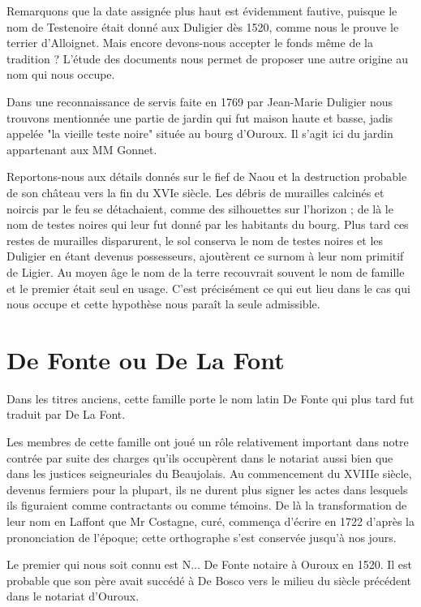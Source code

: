 Remarquons que la date assignée plus haut est évidemment fautive, puisque le nom de Testenoire était donné aux Duligier dès 1520, comme nous le prouve le terrier d'Alloignet. Mais encore devons-nous accepter le fonds même de la tradition ? L'étude des documents nous permet de proposer une autre origine au nom qui nous occupe.

Dans une reconnaissance de servis faite en 1769 par Jean-Marie Duligier nous trouvons mentionnée une partie de jardin qui fut maison haute et basse, jadis appelée "la vieille teste noire" située au bourg d'Ouroux. Il s'agit ici du jardin appartenant aux MM Gonnet.

Reportons-nous aux détails donnés sur le fief de Naou et la destruction probable de son château vers la fin du XVIe siècle. Les débris de murailles calcinés et noircis par le feu se détachaient, comme des silhouettes sur l'horizon ; de là le nom de testes noires qui leur fut donné par les habitants du bourg. Plus tard ces restes de murailles disparurent, le sol conserva le nom de testes noires et les Duligier en étant devenus possesseurs, ajoutèrent ce surnom à leur nom primitif de Ligier. Au moyen âge le nom de la terre recouvrait souvent le nom de famille et le premier était seul en usage. C'est précisément ce qui eut lieu dans le cas qui nous occupe et cette hypothèse nous paraît la seule admissible.

\section*{De Fonte ou De La Font}

Dans les titres anciens, cette famille porte le nom latin De Fonte qui plus tard fut traduit par De La Font.

Les membres de cette famille ont joué un rôle relativement important dans notre contrée par suite des charges qu'ils occupèrent dans le notariat aussi bien que dans les justices seigneuriales du Beaujolais. Au commencement du XVIIIe siècle, devenus fermiers pour la plupart, ils ne durent plus signer les actes dans lesquels ils figuraient comme contractants ou comme témoins. De là la transformation de leur nom en Laffont que Mr Costagne, curé, commença d'écrire en 1722 d'après la prononciation de l'époque; cette orthographe s'est conservée jusqu'à nos jours.

Le premier qui nous soit connu est N... De Fonte notaire à Ouroux en 1520. Il est probable que son père avait succédé à De Bosco vers le milieu du siècle précédent dans le notariat d'Ouroux.

